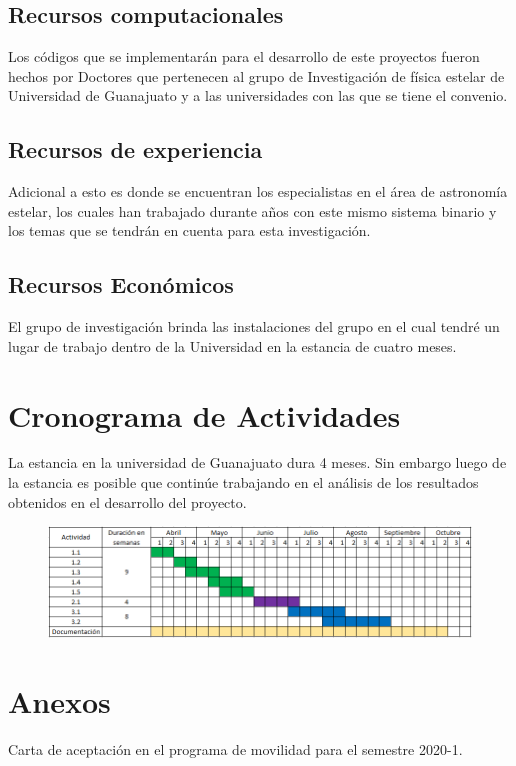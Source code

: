 \documentclass[11pt]{article}
\begin{document}
\subsection{Recursos computacionales}
Los códigos que se implementarán para el desarrollo de este proyectos fueron hechos por Doctores que pertenecen al grupo de Investigación de física estelar de Universidad de Guanajuato y a las universidades con las que se tiene el convenio.

\subsection{Recursos de experiencia}
Adicional a esto es donde se encuentran los especialistas en el área de astronomía estelar, los cuales han trabajado durante años con este mismo sistema binario y los temas que se tendrán en cuenta para esta investigación.
\subsection{Recursos Económicos}
El grupo de investigación brinda las instalaciones del grupo en el cual tendré un lugar de trabajo dentro de la Universidad en la estancia de cuatro meses.


\section{Cronograma de Actividades}
La estancia en la universidad de Guanajuato dura 4 meses. Sin embargo luego de la estancia es posible que continúe trabajando en el análisis de los resultados obtenidos en el desarrollo del proyecto.
\vspace{2mm}

\begin{figure}[h]
    \centering
    \includegraphics[width=1\linewidth]{Cronograma.PNG}
\label{Cronograma}
\end{figure}





\section{ Anexos}

Carta de aceptación en el programa de movilidad para el semestre 2020-1.

\end{document}
